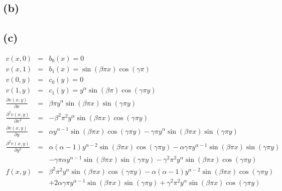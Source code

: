 \documentclass[11pt]{article}
\theoremstyle{definition}
\theoremstyle{remark}
\newcommand{\newpart}{\vspace{-0.5\baselineskip}\hrulefill\vspace{-1.3\baselineskip}}
\theoremstyle{plain}
\begin{document}
\newpart
\subsection*{(b)}


\newpart
\subsection*{(c)}
\begin{eqnarray*}
  v\left(x,0\right)&=&b_0\left(x\right)=0\\
  v\left(x,1\right)&=&b_1\left(x\right)=\sin\left(\beta\pi x\right)\cos\left(\gamma \pi\right)\\
  v\left(0,y\right)&=&c_0\left(y\right)=0\\
  v\left(1,y\right)&=&c_1\left(y\right)=y^\alpha\sin\left(\beta\pi\right)\cos\left(\gamma\pi y\right)\\
  \frac{\partial v\left(x,y\right)}{\partial x}&=&\beta\pi y^\alpha\sin\left(\beta\pi x\right)\sin\left(\gamma\pi y\right)\\
  \frac{\partial^2v\left(x,y\right)}{\partial x^2}&=&-\beta^2\pi^2y^\alpha\sin\left(\beta\pi x\right)\cos\left(\gamma\pi y\right)\\
  \frac{\partial v\left(x,y\right)}{\partial y}&=&\alpha  y^{\alpha -1} \sin (\beta  \pi  x) \cos (\gamma  \pi  y)-\gamma  \pi  y^{\alpha} \sin (\beta  \pi  x) \sin (\gamma  \pi  y)\\
  \frac{\partial^2v\left(x,y\right)}{\partial y^2}&=&\alpha  (\alpha -1) y^{\alpha -2} \sin (\beta  \pi  x) \cos (\gamma  \pi  y)-\alpha \gamma  \pi  y^{\alpha -1} \sin (\beta  \pi  x) \sin (\gamma  \pi  y)\\
                   &&-\gamma  \pi \alpha  y^{\alpha -1} \sin (\beta  \pi  x) \sin (\gamma  \pi  y)-\gamma ^2 \pi ^2 y^{\alpha } \sin (\beta  \pi  x) \cos (\gamma  \pi  y)\\
  f\left(x,y\right)&=&\beta^2\pi^2y^\alpha\sin\left(\beta\pi x\right)\cos\left(\gamma\pi y\right)-\alpha  (\alpha -1) y^{\alpha -2} \sin (\beta  \pi  x) \cos (\gamma  \pi  y)\\
                   &&+2\alpha \gamma  \pi  y^{\alpha -1} \sin (\beta  \pi  x) \sin (\gamma  \pi  y)+\gamma ^2 \pi ^2 y^{\alpha } \sin (\beta  \pi  x) \cos (\gamma  \pi  y)
\end{eqnarray*}
\end{document}
